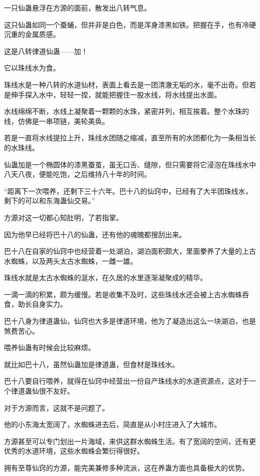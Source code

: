 
\begin{this_body}

一只仙蛊悬浮在方源的面前，散发出八转气息。

这只仙蛊如同一个蚕蛹，但并非是白色，而是浑身漆黑如铁。把握在手，也有冷硬沉重的金属质感。

这是八转律道仙蛊——加！

它以珠线水为食。

珠线水是一种八转的水道仙材，表面上看去是一团清澈无垢的水，毫不出奇。但若是伸手探入水中，轻轻一捏，就能把握住一股水线，将水线提出水面。

水线绵绵不断，水线上凝聚着一颗颗的水珠，紧密并列，相互挨着。整个水珠的线，仿佛是一串项链，美轮美奂。

若是一直将水线提拉上升，珠线水团随之缩减，直至所有的水团都化为一条相当长的水珠线。

仙蛊加是一个椭圆体的漆黑蚕茧，虽无口舌、缝隙，但只需要将它浸泡在珠线水中八天八夜，便能吃饱，之后维持八十年的时间。

“距离下一次喂养，还剩下三十六年。巴十八的仙窍中，已经有了大半团珠线水，剩下的可以和东海蛊仙交易。”

方源对这一切都心知肚明，了若指掌。

因为他早已经将巴十八的仙蛊，还有他的魂魄都搜刮出来。

巴十八在自家的仙窍中也经营着一处湖泊，湖泊面积颇大，里面豢养了大量的上古水蜘蛛，以及两头太古水蜘蛛，一雌一雄。

珠线水就是太古水蜘蛛的涎水，在久居的水里逐渐凝聚成的精华。

一滴一滴的积累，颇为缓慢。若是收集不及时，这些珠线水还会被上古水蜘蛛吞食，助长自身实力。

巴十八身为律道蛊仙，仙窍也大多是律道环境，他为了凝造出这么一块湖泊，也是煞费苦心。

喂养仙蛊有时候会比较麻烦。

就比如巴十八，虽然仙蛊加是律道蛊，但食材是珠线水。

巴十八要自行喂养，就得在仙窍中经营出一份自产珠线水的水道资源点，这对于一个律道蛊仙很不友好。

对于方源而言，这就不是问题了。

他的小东海太宽阔了，水蜘蛛进去后，简直是从小村庄进入了大城市。

方源甚至可以专门划出一片海域，来供这群水蜘蛛生活。有了宽阔的空间，还有更优秀的水道环境，这些水蜘蛛会繁衍得很好。

拥有至尊仙窍的方源，能完美兼修多种流派，这在养蛊方面也具备极大的优势。


\end{this_body}
